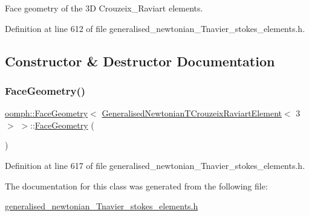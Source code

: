 Face geometry of the 3D Crouzeix\+\_\+\+Raviart elements. 

Definition at line 612 of file generalised\+\_\+newtonian\+\_\+\+Tnavier\+\_\+stokes\+\_\+elements.\+h.



\subsection{Constructor \& Destructor Documentation}
\mbox{\label{classoomph_1_1FaceGeometry_3_01GeneralisedNewtonianTCrouzeixRaviartElement_3_013_01_4_01_4_a325f2234474496666611b08bd568cdf0}} 
\subsubsection{\texorpdfstring{Face\+Geometry()}{FaceGeometry()}}
{\footnotesize\ttfamily \hyperlink{classoomph_1_1FaceGeometry}{oomph\+::\+Face\+Geometry}$<$ \hyperlink{classoomph_1_1GeneralisedNewtonianTCrouzeixRaviartElement}{Generalised\+Newtonian\+T\+Crouzeix\+Raviart\+Element}$<$ 3 $>$ $>$\+::\hyperlink{classoomph_1_1FaceGeometry}{Face\+Geometry} (\begin{DoxyParamCaption}{ }\end{DoxyParamCaption})\hspace{0.3cm}{\ttfamily [inline]}}



Definition at line 617 of file generalised\+\_\+newtonian\+\_\+\+Tnavier\+\_\+stokes\+\_\+elements.\+h.



The documentation for this class was generated from the following file\+:\begin{DoxyCompactItemize}
\item 
\hyperlink{generalised__newtonian__Tnavier__stokes__elements_8h}{generalised\+\_\+newtonian\+\_\+\+Tnavier\+\_\+stokes\+\_\+elements.\+h}\end{DoxyCompactItemize}
